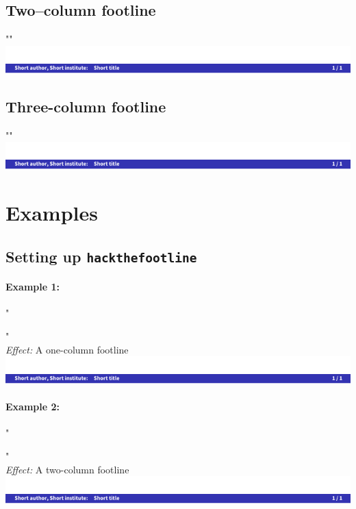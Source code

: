 \documentclass[11pt]{ltxdoc}
\begin{document}
	\subsection*{Two--column footline}
	"" \\[\smallskipamount]
	\includegraphics[page=2,width=\textwidth, trim=0 0 0 15, clip]{hackthefootline-examples}
	
	\subsection*{Three-column footline}
	"" \\[\smallskipamount]
	\includegraphics[page=3,width=\textwidth, trim=0 0 0 15, clip]{hackthefootline-examples}



	\section{Examples}
	\subsection{Setting up \texttt{hackthefootline}}\label{examples-setup}
	\paragraph{Example 1:}
	"\usepackage[onecol]{hackthefootline}" \\
	\textit{Effect:} A one-column footline \\
	\includegraphics[page=1, width=\textwidth, trim=0 0 0 15, clip]{hackthefootline-examples}
	
	
	\paragraph{Example 2:}
	"\usepackage[twocols]{hackthefootline}" \\
	\textit{Effect:} A two-column footline \\
	\includegraphics[page=2, width=\textwidth, trim=0 0 0 15, clip]{hackthefootline-examples}
	
\end{document}
